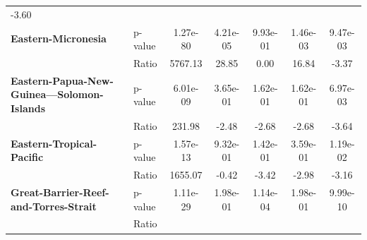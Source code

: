 \begin{table}[H]
{\begin{tabular}{llccccc}
            -3.60
            \\
            \textbf{Eastern-Micronesia}                         & p-value  &
            1.27e-80                                            & 4.21e-05 &
            9.93e-01                                            & 1.46e-03 &
            9.47e-03
            \\
            \textbf{}                                           & Ratio    &
            5767.13                                             & 28.85    &
            0.00
                                                                & 16.84    &
            -3.37
            \\
            \textbf{Eastern-Papua-New-Guinea---Solomon-Islands} &
            p-value                                             &
            6.01e-09                                            &
            3.65e-01                                            &
            1.62e-01                                            &
            1.62e-01                                            &
            6.97e-03
            \\
            \textbf{}                                           & Ratio    &
            231.98                                              & -2.48    &
            -2.68
                                                                & -2.68    &
            -3.64
            \\
            \textbf{Eastern-Tropical-Pacific}                   & p-value  &
            1.57e-13                                            & 9.32e-01 &
            1.42e-01                                            & 3.59e-01 &
            1.19e-02
            \\
            \textbf{}                                           & Ratio    &
            1655.07                                             & -0.42    &
            -3.42
                                                                & -2.98    &
            -3.16
            \\
            \textbf{Great-Barrier-Reef-and-Torres-Strait}       &
            p-value                                             &
            1.11e-29                                            &
            1.98e-01                                            &
            1.14e-04                                            &
            1.98e-01                                            &
            9.99e-10
            \\
            \textbf{}                                           & Ratio    &

\end{tabular}}
\end{table}
